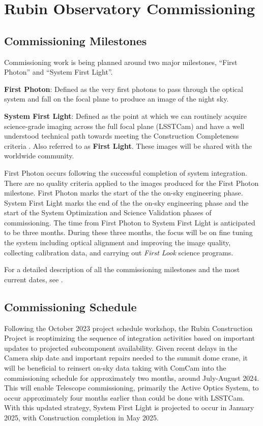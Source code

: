\section{Rubin Observatory Commissioning}
\label{sec:commissioning}

\subsection{Commissioning Milestones}
\label{ssec:commissioning-milestones}

Commissioning work is being planned around two major milestones, ``First Photon'' and ``System First Light''. 

\textbf {First Photon}: Defined as the very first photons to pass through the optical system and fall on the  focal plane to produce an image of the night sky.

\textbf {System First Light}: Defined as the point at which we can routinely acquire science-grade imaging across the full focal plane (LSSTCam) and have a well understood technical path towards meeting the Construction Completeness criteria   .
Also referred to as \textbf{First Light}. 
These images will be shared with the worldwide community. 

First Photon occurs following the successful completion of system integration. 
There are no quality criteria applied to the images produced for the First Photon milestone. 
First Photon  marks the start of the the on-sky engineering phase.
System First Light  marks the end of the the on-sky engineering phase and the start of the System Optimization and Science Validation phases of commissioning.
The time from First Photon to System First Light is anticipated to be three months.
During these three months, the focus will be on fine tuning the system including optical alignment and improving the image quality, collecting calibration data, and carrying out \textit{First Look} science programs. 

For a detailed description of all the commissioning milestones and the most current dates, see .

\subsection{Commissioning Schedule}
\label{ssec:commissioning-schedule}

Following the October 2023 project schedule workshop, the Rubin Construction Project is reoptimizing the sequence of integration activities based on important updates to projected subcomponent availability.
Given recent delays in the Camera ship date and important repairs needed to the summit dome crane, it will be beneficial to reinsert on-sky data taking with ComCam into the commissioning schedule for approximately two months, around July-August 2024. 
This will enable Telescope commissioning, primarily the Active Optics System, to occur approximately four months earlier than could be done with LSSTCam. 
With this updated strategy, System First Light  is projected to occur in January 2025, with Construction completion in May 2025.

